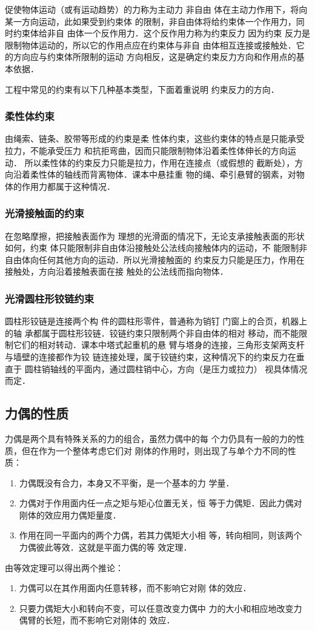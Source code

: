 促使物体运动（或有运动趋势）的力称为主动力 非自由
体在主动力作用下，将向某一方向运动，此如果受到约束体
的限制，非自由体将给约束体一个作用力，同时约束体给非自
由体一个反作用力．这个反作用力称为约束反力 因为约束
反力是限制物体运动的，所以它的作用点应在约束体与非自
由体相互连接或接触处．它的方向应与约束体所限制的运动
方向相反，这是确定约束反力方向和作用点的基本依据．

工程中常见的约束有以下几种基本类型，下面着重说明
约束反力的方向．

\subsubsection{柔性体约束}

由绳索、链条、胶带等形成的约束是柔
性体约束，这些约束体的特点是只能承受拉力，不能承受压力
和抗拒弯曲，因而只能限制物体沿着柔性体伸长的方向运动．
所以柔性体的约束反力只能是拉力，作用在连接点（或假想的
截断处），方向沿着柔性体的轴线而背离物体．课本中悬挂重
物的绳、牵引悬臂的钢素，对物体的作用力都属于这种情况．

\subsubsection{光滑接触面的约束}

在忽略摩擦，把接触表面作为
理想的光滑面的情况下，无论支承接触表面的形状如何，约束
体只能限制非自由体沿接触处公法线向接触体内的运动，不
能限制非自由体向任何其他方向的运动．所以光滑接触面的
约束反力只能是压力，作用在接触处，方向沿着接触表面在接
触处的公法线而指向物体．

\subsubsection{光滑圆柱形铰链约束}

圆柱形铰链是连接两个构
件的圆柱形零件，普通称为销钉 门窗上的合页，机器上的轴
承都属于圆柱形铰链．铰链约束只限制两个非自由体的相对
移动，而不能限制它们的相对转动．课本中塔式起重机的悬
臂与塔身的连接，三角形支架两支杆与墙壁的连接都作为铰
链连接处理，属于铰链约束，这种情况下的约束反力在垂直于
圆柱销轴线的平面内，通过圆柱销中心，方向（是压力或拉力）
视具体情况而定．

\subsection{力偶的性质}
力偶是两个具有特殊关系的力的组合，虽然力偶中的每
个力仍具有一般的力的性质，但在作为一个整体考虑它们对
刚体的作用时，则出现了与单个力不同的性质：
\begin{enumerate}
\item 力偶既没有合力，本身又不平衡，是一个基本的力
学量．
\item 力偶对于作用面内任一点之矩与矩心位置无关，恒
等于力偶矩．因此力偶对刚体的效应用力偶矩量度．
\item 作用在同一平面内的两个力偶，若其力偶矩大小相
等，转向相同，则该两个力偶彼此等效．这就是平面力偶的等
效定理．
\end{enumerate}

由等效定理可以得出两个推论：
\begin{enumerate}
\item 力偶可以在其作用面内任意转移，而不影响它对刚
体的效应．
\item 只要力偶矩大小和转向不变，可以任意改变力偶中
力的大小和相应地改变力偶臂的长短，而不影响它对刚体的
效应．
\end{enumerate}





